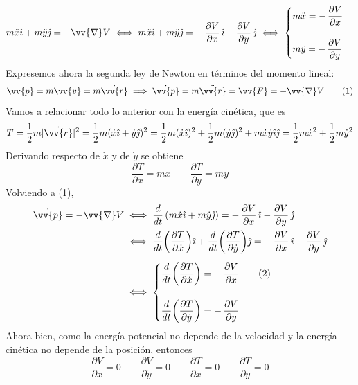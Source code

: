 \documentclass[12pt]{report}
\begin{document}
\[m\ddot{x}\hat{\imath} + m\ddot{y}\hat{\jmath} = -\vv{\nabla}V \iff m\ddot{x}\hat{\imath} + m\ddot{y}\hat{\jmath} = - \, \frac{\partial V}{\partial x} \, \hat{\imath} - \frac{\partial V}{\partial y} \, \hat{\jmath} \iff \begin{cases}
\displaystyle m\ddot{x} = - \, \frac{\partial V}{\partial x} \\
\\
\displaystyle m\ddot{y} = - \, \frac{\partial V}{\partial y}
\end{cases}\]
Expresemos ahora la segunda ley de Newton en términos del momento lineal:
\[
   \vv{p} = m\vv{v} = m\dot{\vv{r}} \implies \dot{\vv{p}} = m\ddot{\vv{r}} = \vv{F} = -\vv{\nabla}V \tag{1}
\]
Vamos a relacionar todo lo anterior con la energía cinética, que es
\[T = \frac{1}{2}m| \dot{\vv{r}}| ^ 2 = \frac{1}{2}m(\dot{x} \hat{\imath} +\dot{y} \hat{\jmath} )^2 = \frac{1}{2}m(\dot{x}\hat{\imath})^2 + \frac{1}{2}m(\dot{y}\hat{\jmath})^2 + m\dot{x}\dot{y}\hat{\imath}\hat{\jmath} = \frac{1}{2}m\dot{x}^2 + \frac{1}{2}m\dot{y}^2\]
Derivando respecto de $\dot{x}$ y de $\dot{y}$ se obtiene
\[\frac{\partial T}{\partial \dot{x}} = m\dot{x} \qquad \frac{\partial T}{\partial \dot{y}} = m\dot{y}\]
Volviendo a (1),
\begin{align*}
\dot{\vv{p}} = -\vv{\nabla}V &\iff \frac{d}{dt} \, (m\dot{x}\hat{\imath} + m\dot{y}\hat{\jmath}) = - \, \frac{\partial V}{\partial x} \, \hat{\imath} - \frac{\partial V}{\partial y} \, \hat{\jmath}  \\ 
&\iff \frac{d}{dt}\biggl(\frac{\partial T}{\partial \dot{x}}\biggr)\hat{\imath} + \frac{d}{dt}\biggl(\frac{\partial T}{\partial \dot{y}}\biggr)\hat{\jmath} = - \, \frac{\partial V}{\partial x} \, \hat{\imath} - \frac{\partial V}{\partial y} \, \hat{\jmath} \\[5pt]
&\iff
\begin{cases}
    \displaystyle \frac{d}{dt}\biggl(\frac{\partial T}{\partial \dot{x}}\biggr) = - \, \frac{\partial V}{\partial x} \tag{2} \\
    \\
    \displaystyle \frac{d}{dt}\biggl(\frac{\partial T}{\partial \dot{y}}\biggr) = - \, \frac{\partial V}{\partial y}
\end{cases}
\end{align*}
Ahora bien, como la energía potencial no depende de la velocidad y la energía cinética no depende de la posición, entonces
\[\frac{\partial V}{\partial \dot{x}} = 0 \qquad \frac{\partial V}{\partial \dot{y}} = 0 \qquad \frac{\partial T}{\partial x} = 0 \qquad \frac{\partial T}{\partial y} = 0 \]
\end{document}
